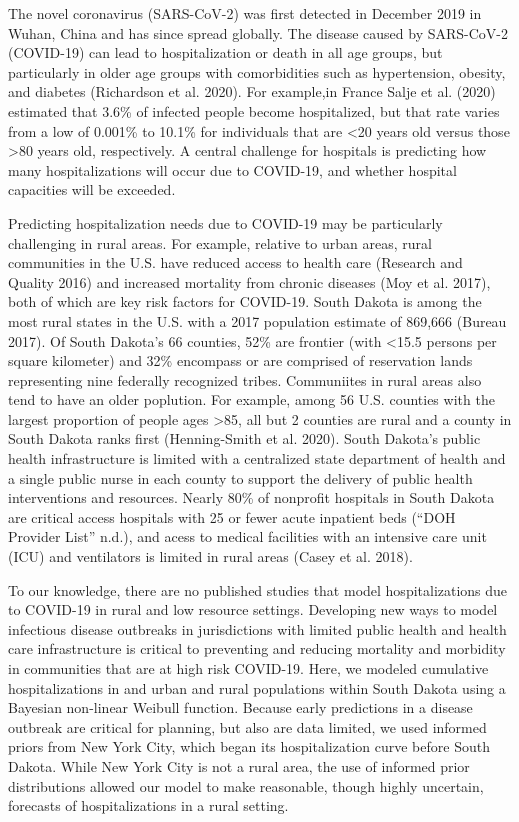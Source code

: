\documentclass[
]{article}
\begin{document}
The novel coronavirus (SARS-CoV-2) was first detected in December 2019 in Wuhan, China and has since spread globally. The disease caused by SARS-CoV-2 (COVID-19) can lead to hospitalization or death in all age groups, but particularly in older age groups with comorbidities such as hypertension, obesity, and diabetes (Richardson et al. 2020). For example,in France Salje et al. (2020) estimated that 3.6\% of infected people become hospitalized, but that rate varies from a low of 0.001\% to 10.1\% for individuals that are \textless20 years old versus those \textgreater80 years old, respectively. A central challenge for hospitals is predicting how many hospitalizations will occur due to COVID-19, and whether hospital capacities will be exceeded.

Predicting hospitalization needs due to COVID-19 may be particularly challenging in rural areas. For example, relative to urban areas, rural communities in the U.S. have reduced access to health care (Research and Quality 2016) and increased mortality from chronic diseases (Moy et al. 2017), both of which are key risk factors for COVID-19. South Dakota is among the most rural states in the U.S. with a 2017 population estimate of 869,666 (Bureau 2017). Of South Dakota's 66 counties, 52\% are frontier (with \textless15.5 persons per square kilometer) and 32\% encompass or are comprised of reservation lands representing nine federally recognized tribes. Communiites in rural areas also tend to have an older poplution. For example, among 56 U.S. counties with the largest proportion of people ages \textgreater85, all but 2 counties are rural and a county in South Dakota ranks first (Henning-Smith et al. 2020). South Dakota's public health infrastructure is limited with a centralized state department of health and a single public nurse in each county to support the delivery of public health interventions and resources. Nearly 80\% of nonprofit hospitals in South Dakota are critical access hospitals with 25 or fewer acute inpatient beds (``DOH Provider List'' n.d.), and acess to medical facilities with an intensive care unit (ICU) and ventilators is limited in rural areas (Casey et al. 2018).

To our knowledge, there are no published studies that model hospitalizations due to COVID-19 in rural and low resource settings. Developing new ways to model infectious disease outbreaks in jurisdictions with limited public health and health care infrastructure is critical to preventing and reducing mortality and morbidity in communities that are at high risk COVID-19. Here, we modeled cumulative hospitalizations in and urban and rural populations within South Dakota using a Bayesian non-linear Weibull function. Because early predictions in a disease outbreak are critical for planning, but also are data limited, we used informed priors from New York City, which began its hospitalization curve before South Dakota. While New York City is not a rural area, the use of informed prior distributions allowed our model to make reasonable, though highly uncertain, forecasts of hospitalizations in a rural setting.
\end{document}
